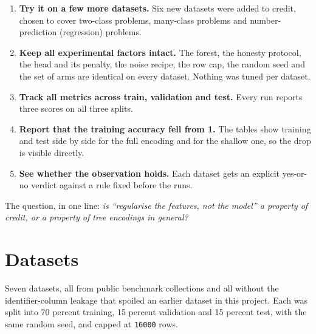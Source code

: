 \documentclass[11pt,a4paper]{article}
\newcommand{\num}[1]{\texttt{#1}}
\begin{document}
\begin{enumerate}
  \item \textbf{Try it on a few more datasets.} Six new datasets were added to
        credit, chosen to cover two-class problems, many-class problems and
        number-prediction (regression) problems.
  \item \textbf{Keep all experimental factors intact.} The forest, the honesty
        protocol, the head and its penalty, the noise recipe, the row cap, the
        random seed and the set of arms are identical on every dataset. Nothing
        was tuned per dataset.
  \item \textbf{Track all metrics across train, validation and test.} Every run
        reports three scores on all three splits.
  \item \textbf{Report that the training accuracy fell from 1.} The tables show
        training and test side by side for the full encoding and for the
        shallow one, so the drop is visible directly.
  \item \textbf{See whether the observation holds.} Each dataset gets an
        explicit yes-or-no verdict against a rule fixed before the runs.
\end{enumerate}

The question, in one line: \emph{is ``regularise the features, not the model''
a property of credit, or a property of tree encodings in general?}

\section{Datasets}

Seven datasets, all from public benchmark collections and all without the
identifier-column leakage that spoiled an earlier dataset in this project. Each
was split into 70 percent training, 15 percent validation and 15 percent test,
with the same random seed, and capped at \num{16000} rows.
\end{document}
